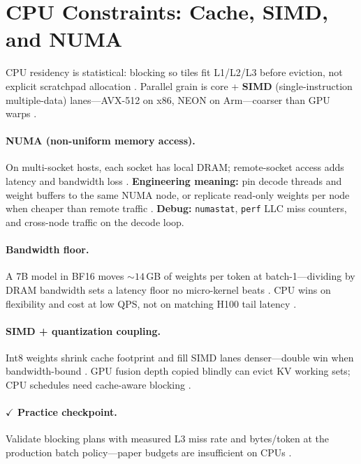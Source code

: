 \section{CPU Constraints: Cache, SIMD, and NUMA}
\label{sec:cpu_constraints}

CPU residency is statistical: blocking so tiles fit L1/L2/L3 before eviction, not explicit scratchpad allocation \citep{dlbook,rotem2018glow}.
Parallel grain is core + \textbf{SIMD} (single-instruction multiple-data) lanes---AVX-512 on x86, NEON on Arm---coarser than GPU warps \citep{dlbook}.

\paragraph{NUMA (non-uniform memory access).}
On multi-socket hosts, each socket has local DRAM; remote-socket access adds latency and bandwidth loss \citep{patel2025llminference}.
\textbf{Engineering meaning:} pin decode threads and weight buffers to the same NUMA node, or replicate read-only weights per node when cheaper than remote traffic \citep{memoryfloor2026}.
\textbf{Debug:} \texttt{numastat}, \texttt{perf} LLC miss counters, and cross-node traffic on the decode loop.

\paragraph{Bandwidth floor.}
A 7B model in BF16 moves ${\sim}14$\,GB of weights per token at batch-1---dividing by DRAM bandwidth sets a latency floor no micro-kernel beats \citep{kwon2023vllm,memoryfloor2026}.
CPU wins on flexibility and cost at low QPS, not on matching H100 tail latency \citep{patel2025llminference}.

\paragraph{SIMD + quantization coupling.}
Int8 weights shrink cache footprint and fill SIMD lanes denser---double win when bandwidth-bound \citep{dlbook}.
GPU fusion depth copied blindly can evict KV working sets; CPU schedules need cache-aware blocking \citep{rotem2018glow}.

\paragraph{$\checkmark$ Practice checkpoint.}
Validate blocking plans with measured L3 miss rate and bytes/token at the production batch policy---paper budgets are insufficient on CPUs \citep{memoryfloor2026,dlbook}.

